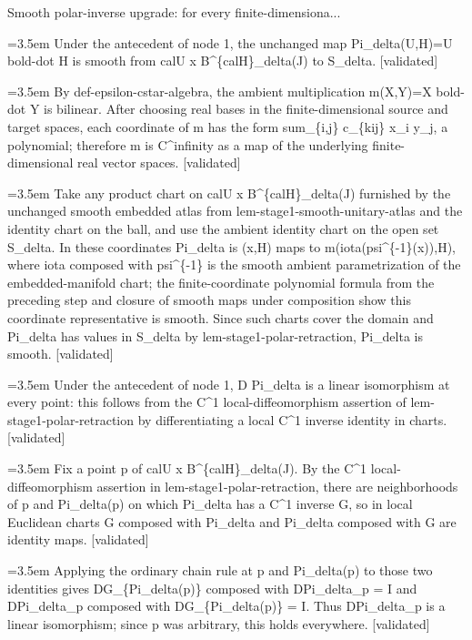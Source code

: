 \documentclass{article}
\newcommand{\step}[1]{\par\noindent\hangindent=3.5em\hangafter=1%
  \makebox[3.5em][l]{\textbf{#1.}}}
\newcommand{\steptag}[1]{\hfill{\small\textsf{[#1]}}}
\begin{document}
\begin{proofbox}{Smooth polar-inverse upgrade: for every finite-dimensiona...}
\step{1.2} Under the antecedent of node 1, the unchanged map Pi\_delta(U,H)=U bold-dot H is smooth from calU x B\textasciicircum{}\{calH\}\_delta(J) to S\_delta. \steptag{validated} \\[6pt]
\step{1.2.1} By def-epsilon-cstar-algebra, the ambient multiplication m(X,Y)=X bold-dot Y is bilinear. After choosing real bases in the finite-dimensional source and target spaces, each coordinate of m has the form sum\_\{i,j\} c\_\{kij\} x\_i y\_j, a polynomial; therefore m is C\textasciicircum{}infinity as a map of the underlying finite-dimensional real vector spaces. \steptag{validated} \\[4pt]
\step{1.2.2} Take any product chart on calU x B\textasciicircum{}\{calH\}\_delta(J) furnished by the unchanged smooth embedded atlas from lem-stage1-smooth-unitary-atlas and the identity chart on the ball, and use the ambient identity chart on the open set S\_delta. In these coordinates Pi\_delta is (x,H) maps to m(iota(psi\textasciicircum{}\{-1\}(x)),H), where iota composed with psi\textasciicircum{}\{-1\} is the smooth ambient parametrization of the embedded-manifold chart; the finite-coordinate polynomial formula from the preceding step and closure of smooth maps under composition show this coordinate representative is smooth. Since such charts cover the domain and Pi\_delta has values in S\_delta by lem-stage1-polar-retraction, Pi\_delta is smooth. \steptag{validated} \\[4pt]
\step{1.3} Under the antecedent of node 1, D Pi\_delta is a linear isomorphism at every point: this follows from the C\textasciicircum{}1 local-diffeomorphism assertion of lem-stage1-polar-retraction by differentiating a local C\textasciicircum{}1 inverse identity in charts. \steptag{validated} \\[6pt]
\step{1.3.1} Fix a point p of calU x B\textasciicircum{}\{calH\}\_delta(J). By the C\textasciicircum{}1 local-diffeomorphism assertion in lem-stage1-polar-retraction, there are neighborhoods of p and Pi\_delta(p) on which Pi\_delta has a C\textasciicircum{}1 inverse G, so in local Euclidean charts G composed with Pi\_delta and Pi\_delta composed with G are identity maps. \steptag{validated} \\[4pt]
\step{1.3.2} Applying the ordinary chain rule at p and Pi\_delta(p) to those two identities gives DG\_\{Pi\_delta(p)\} composed with DPi\_delta\_p = I and DPi\_delta\_p composed with DG\_\{Pi\_delta(p)\} = I. Thus DPi\_delta\_p is a linear isomorphism; since p was arbitrary, this holds everywhere. \steptag{validated} \\[4pt]

\end{proofbox}
\end{document}
